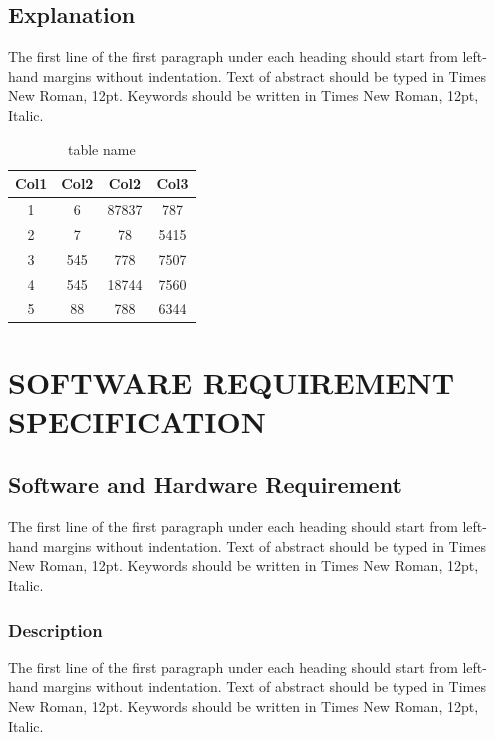 \documentclass[a4paper, 12pt]{report}
\begin{document}
\section{Explanation}
\par The first line of the first paragraph under each heading should start from left-hand margins without indentation.  Text of abstract should be typed in Times New Roman, 12pt. Keywords should be written in Times New Roman, 12pt, Italic.\\
\begin{table}[h]

\begin{center}
 \begin{tabular}{||c|c|c|c||} 

 \hline
 Col1 & Col2 & Col2 & Col3 \\ [0.5ex] 
 \hline\hline
 1 & 6 & 87837 & 787 \\ 
 \hline
 2 & 7 & 78 & 5415 \\
 \hline
 3 & 545 & 778 & 7507 \\
 \hline
 4 & 545 & 18744 & 7560 \\
 \hline
 5 & 88 & 788 & 6344 \\ 
 \hline
\end{tabular}
\caption{table name}
\end{center}
\end{table}

\chapter{SOFTWARE REQUIREMENT SPECIFICATION}

\section{Software and Hardware Requirement}
\par The first line of the first paragraph under each heading should start from left-hand margins without indentation.  Text of abstract should be typed in Times New Roman, 12pt. Keywords should be written in Times New Roman, 12pt, Italic.

\subsection{Description}
\par The first line of the first paragraph under each heading should start from left-hand margins without indentation.  Text of abstract should be typed in Times New Roman, 12pt. Keywords should be written in Times New Roman, 12pt, Italic.
\end{document}
